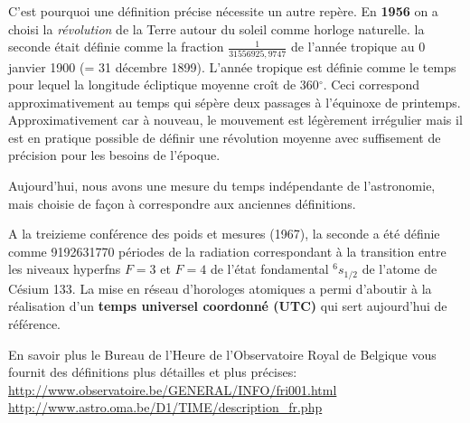 \documentclass[12pt]{report}
\begin{document}
C'est pourquoi une définition précise nécessite un autre repère.
En \textbf{1956} on a choisi la \textit{révolution} de la Terre autour du soleil comme horloge naturelle. la seconde était définie comme la fraction $\frac{1}{31556925,9747}$ de l'année tropique au 0 janvier 1900 (= 31 décembre 1899). L'année tropique est définie comme le temps pour lequel la longitude écliptique moyenne croît de 360$^\circ$. Ceci correspond approximativement au temps qui sépère deux passages à l'équinoxe de printemps. Approximativement car à nouveau, le mouvement est légèrement irrégulier mais il est en pratique possible de définir une révolution moyenne avec suffisement de précision pour les besoins de l'époque. 

Aujourd'hui, nous avons une mesure du temps indépendante de l'astronomie, mais choisie de façon à correspondre aux anciennes définitions.

A la treizieme conférence des poids et mesures (1967), la seconde a été définie comme 9192631770 périodes de la radiation correspondant à la transition entre les niveaux hyperfns $F=3$ et $F=4$ de l'état fondamental $^6 s_{1/2}$ de l'atome de Césium 133.  La mise en réseau d'horologes atomiques a permi d'aboutir à la réalisation d'un \textbf{temps universel coordonné (UTC)} qui sert aujourd'hui de référence. 

En savoir plus le Bureau de l'Heure de l'Observatoire Royal de Belgique vous fournit des définitions plus détailles et plus précises: \\
\noindent
\url{http://www.observatoire.be/GENERAL/INFO/fri001.html} \\
\url{http://www.astro.oma.be/D1/TIME/description_fr.php}
\end{document}
